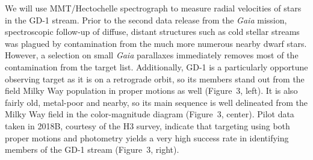 \documentclass[12pt]{article}
\begin{document}
We will use MMT/Hectochelle spectrograph to measure radial velocities of stars in the GD-1 stream.
Prior to the second data release from the \emph{Gaia} mission, spectroscopic follow-up of diffuse, distant structures such as cold stellar streams was plagued by contamination from the much more numerous nearby dwarf stars.
However, a selection on small \emph{Gaia} parallaxes immediately removes most of the contamination from the target list.
Additionally, GD-1 is a particularly opportune observing target as it is on a retrograde orbit, so its members stand out from the field Milky Way population in proper motions as well (Figure~3, left).
It is also fairly old, metal-poor and nearby, so its main sequence is well delineated from the Milky Way field in the color-magnitude diagram (Figure~3, center).
Pilot data taken in 2018B, courtesy of the H3 survey, indicate that targeting using both proper motions and photometry yields a very high success rate in identifying members of the GD-1 stream (Figure~3, right). 
\end{document}
